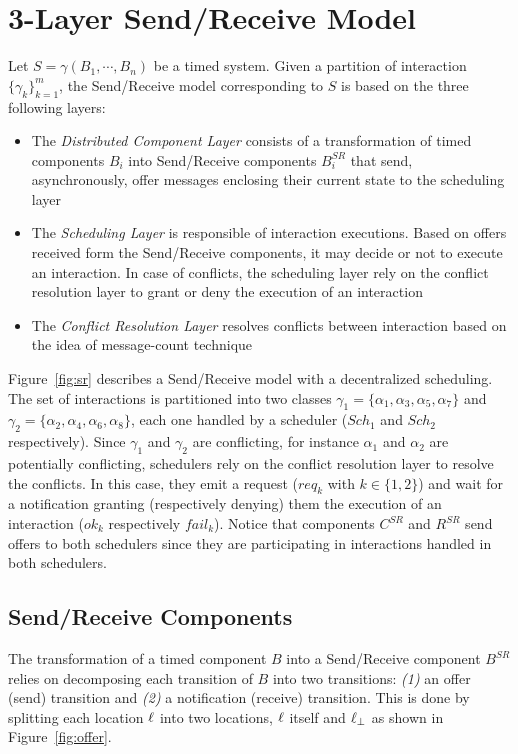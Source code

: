 \section{3-Layer Send/Receive Model}
Let $S=\gamma(B_1,\cdots,B_n)$ be a timed system. Given a partition of interaction
$\{\gamma_k\}^m_{k=1}$, the Send/Receive model corresponding to $S$ is based on the three
following layers:
\begin{itemize}
  \item The \emph{Distributed Component Layer} consists of a transformation of timed components
    $B_i$ into Send/Receive components $B_i^{SR}$ that send, asynchronously, offer messages 
    enclosing their current state to the scheduling layer 
  \item The \emph{Scheduling Layer} is responsible of interaction executions. Based on offers 
    received form the Send/Receive components, it may decide or not to execute an interaction.
    In case of conflicts, the scheduling layer rely on the conflict resolution layer to grant
    or deny the execution of an interaction
  \item The \emph{Conflict Resolution Layer} resolves conflicts between interaction based on
    the idea of message-count technique
\end{itemize}


\begin{example}
  Figure~\ref{fig:sr} describes a Send/Receive model with a decentralized scheduling. 
  The set of interactions is partitioned into two classes 
  $\gamma_1=\{\alpha_1,\alpha_3,\alpha_5,\alpha_7\}$ and
  $\gamma_2=\{\alpha_2,\alpha_4,\alpha_6,\alpha_8\}$, each one handled by a scheduler ($Sch_1$
  and $Sch_2$ respectively). Since $\gamma_1$ and $\gamma_2$ are conflicting, for instance
  $\alpha_1$ and $\alpha_2$ are potentially conflicting, schedulers rely on the conflict
  resolution layer to resolve the conflicts. In this case, they emit a request ($req_k$ with
  $k\in\{1,2\}$) and wait for a notification granting (respectively denying) them the execution
  of an interaction ($ok_k$ respectively $fail_k$).
  Notice that components $C^{SR}$ and $R^{SR}$ send offers to both schedulers since
  they are participating in interactions handled in both schedulers.
\end{example}
\subsection{Send/Receive Components}

The transformation of a timed component $B$ into a Send/Receive component $B^{SR}$ relies 
on decomposing each transition of $B$ into two transitions: \emph{(1)} an offer (send)
transition and \emph{(2)} a notification (receive) transition. This is done by splitting
each location $\ell$ into two locations, $\ell$ itself and $\ell_{\perp}$ as shown in 
Figure~\ref{fig:offer}.

